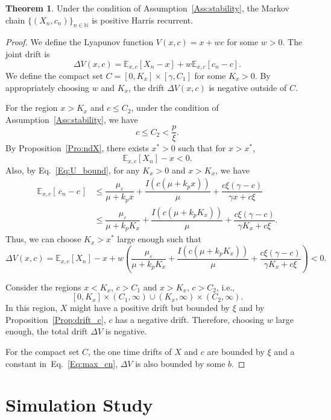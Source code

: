 \documentclass[11pt]{article}
\theoremstyle{definition}
\newtheorem{theorem}{Theorem}
\begin{document}
\begin{theorem}
	Under the condition of Assumption~\ref{Ass:stability},
	the Markov chain $\{(X_n, c_n)\}_{n \in \mathbb{N}}$ is positive Harris recurrent.
\end{theorem}
\begin{proof}
	
	We define the Lyapunov function $V(x, c) = x + wc$ for some $w > 0$. 
	The joint drift is
	$$ \Delta V(x, c) = \mathbb{E}_{x,c}[X_{n} - x ] + w \mathbb{E}_{x,c}[c_{n} - c ].$$
	We define the compact set $C = [0, K_x] \times [\gamma, C_1]$ for some $K_x > 0$.
	By appropriately choosing $w$ and $K_x$, the drift $\Delta V(x, c)$ is negative outside of $C$.
	
	For the region $x > K_x$ and $c \le  C_2$, under the condition of Assumption~\ref{Ass:stability},
	we have
	$$ c \leq C_2  < \frac{p}{\xi}.$$
	By Proposition~\ref{Pro:ndX}, there exists $x^* >0$ such that for $x > x^*$,
	$$\mathbb{E}_{x, c}[X_n ] - x < 0.$$
	Also, by Eq.~\eqref{Eq:U_bound}, for any $K_x >0$ and $x > K_x$, we have
	\begin{align*}
		\mathbb{E}_{x,c}[\,c_n - c\,] &\leq  \dfrac{\mu_{\varepsilon}}{\mu + k_p x}
		+ \dfrac{I(c(\mu + k_p x))}{\mu}
		+ \dfrac{c\xi(\gamma - c)}{\gamma x + c \xi} \\
		&\leq   \dfrac{\mu_{\varepsilon}}{\mu + k_p K_x} +  \dfrac{I(c(\mu + k_p K_x))}{\mu}  +   \dfrac{c\xi(\gamma - c)}{\gamma K_x + c \xi}. \label{Eq:ineq_region1}
	\end{align*}
	Thus, we can  choose $K_x > x^*$ large enough such that 
	$$ \Delta V(x, c) = \mathbb{E}_{x, c}[X_n ] - x + w \left( \dfrac{\mu_{\varepsilon}}{\mu + k_p K_x} +  \dfrac{I(c(\mu + k_p K_x))}{\mu}  +   \dfrac{c\xi(\gamma - c)}{\gamma K_x + c \xi} \right) < 0 .$$
	
	Consider the regions $x < K_x$, $c > C_1$ and $x> K_x$, $c > C_2$, i.e., 
	$$[0, K_x] \times (C_1, \infty) \cup (K_x, \infty) \times (C_2, \infty).$$
	In this region, $X$ might have a positive drift but bounded by $\xi$ and by Proposition~\ref{Prop:drift_c}, $c$ has a negative drift.
	Therefore, choosing $w$ large enough, the total drift $ \Delta V$ is negative.
	
	For the compact set $C$, the one time drifts of $X$ and $c$ are bounded by $\xi$ and a constant in~Eq.~\eqref{Eq:max_cn},
	$ \Delta V $ is also bounded by some $b$.
	
\end{proof}

\section{Simulation Study}\label{Sect:simul}
\end{document}
